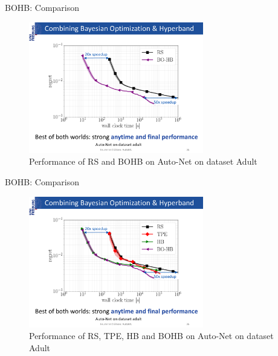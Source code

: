 \begin{frame}{BOHB: Comparison}
\begin{figure}
    \centering
    \includegraphics[width=0.68\textwidth]{../w07_hpo_speedup/images/bohb/BOHB_3.pdf}
    \caption{Performance of RS and BOHB on Auto-Net on dataset Adult}
\end{figure}

\end{frame}
\begin{frame}{BOHB: Comparison}
\begin{figure}
    \centering
    \includegraphics[width=0.68\textwidth]{../w07_hpo_speedup/images/bohb/BOHB_4.pdf}
    \caption{Performance of RS, TPE, HB and BOHB on Auto-Net on dataset Adult}
\end{figure}

\end{frame}
